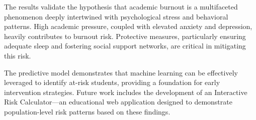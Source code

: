 \documentclass[10pt,twocolumn,letterpaper]{article}
\begin{document}
The results validate the hypothesis that academic burnout is a multifaceted phenomenon deeply intertwined with psychological stress and behavioral patterns. High academic pressure, coupled with elevated anxiety and depression, heavily contributes to burnout risk. Protective measures, particularly ensuring adequate sleep and fostering social support networks, are critical in mitigating this risk.

The predictive model demonstrates that machine learning can be effectively leveraged to identify at-risk students, providing a foundation for early intervention strategies. Future work includes the development of an Interactive Risk Calculator---an educational web application designed to demonstrate population-level risk patterns based on these findings.
\end{document}

